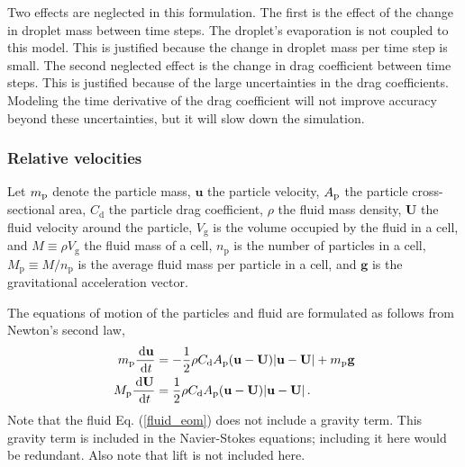 Two effects are neglected in this formulation. The first is the effect of the change in droplet mass between  time steps. The
droplet's evaporation is not coupled to this model. This is justified because the change in droplet mass per time step is small.
The second neglected effect is the change in drag coefficient between time steps. This is justified because of the large
uncertainties in the drag coefficients. Modeling the time derivative of the drag coefficient will not improve accuracy beyond
these uncertainties, but it will slow down the simulation.

\subsubsection*{Relative velocities}
Let $m_{\rm p}$ denote the particle mass, $\mathbf{u}$ the particle velocity, $A_{\rm p}$ the particle cross-sectional area,
$C_\text{d}$ the particle drag coefficient, $\rho$ the fluid mass density, $\mathbf{U}$ the fluid velocity around the particle,
$V_\text{g}$ is the volume occupied by the fluid in a cell, and $M \equiv \rho V_\text{g}$ the fluid mass of a cell, $n_\text{p}$
is the number of particles in a cell, $M_\text{p} \equiv M/n_\text{p}$ is the average fluid mass per particle in a cell, and
$\mathbf{g}$ is the gravitational acceleration vector.

The equations of motion of the particles and fluid are formulated as follows from Newton's second law,
\begin{align}
    \label{particle_eom}
    m_{\rm p} \frac{\,\mathrm{d} \mathbf{u}}{\,\mathrm{d} t} &= - \frac{1}{2} \rho C_\text{d} A_{\rm p} (\mathbf{u} - \mathbf{U}) |\mathbf{u} -
\mathbf{U}| + m_{\rm p} \mathbf{g} \\
    \label{fluid_eom}
    M_{\rm p} \frac{\,\mathrm{d} \mathbf{U}}{\,\mathrm{d} t} &= \frac{1}{2} \rho C_\text{d} A_{\rm p} (\mathbf{u} - \mathbf{U}) |\mathbf{u} -
\mathbf{U}| \,.
\end{align}
Note that the fluid Eq. (\ref{fluid_eom}) does not include a gravity term. This gravity term is included in the Navier-Stokes
equations; including it here would be redundant. Also note that lift is not included here.

